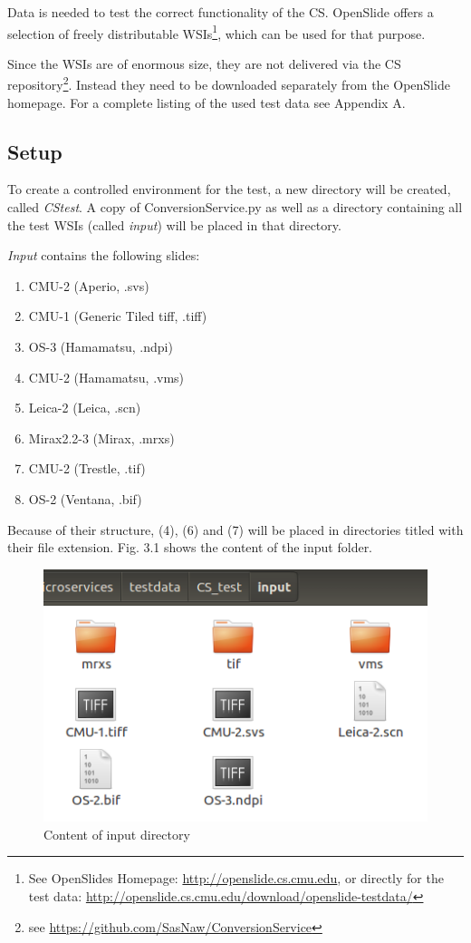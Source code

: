 Data is needed to test the correct functionality of the CS. OpenSlide offers a selection of freely distributable WSIs\footnote{See OpenSlides Homepage: \url{http://openslide.cs.cmu.edu}, or directly for the test data: \url{http://openslide.cs.cmu.edu/download/openslide-testdata/}}, which can be used for that purpose.

Since the WSIs are of enormous size, they are not delivered via the CS repository\footnote{see \url{https://github.com/SasNaw/ConversionService}}. Instead they need to be downloaded separately from the OpenSlide homepage. For a complete listing of the used test data see Appendix A.


\subsection{Setup}

To create a controlled environment for the test, a new directory will be created, called \emph{CS{\textunderscore}test}. A copy of ConversionService.py as well as a directory containing all the test WSIs (called \emph{input}) will be placed in that directory.

\emph{Input} contains the following slides:

\begin{enumerate}[(1)]
	\item CMU-2 (Aperio, .svs)
	\item CMU-1 (Generic Tiled tiff, .tiff)
	\item OS-3 (Hamamatsu, .ndpi)
	\item CMU-2 (Hamamatsu, .vms)
	\item Leica-2 (Leica, .scn)
	\item Mirax2.2-3 (Mirax, .mrxs)
	\item CMU-2 (Trestle, .tif)
	\item OS-2 (Ventana, .bif)
\end{enumerate}

Because of their structure, (4), (6) and (7) will be placed in directories titled with their file extension. Fig. 3.1 shows the content of the input folder.

\begin{figure}[H]
	\begin{center}
		\includegraphics[scale=0.5]{img/inputDir.png}
		\caption{Content of input directory}
		\label{fig:fig3.2}
	\end{center}
\end{figure}

